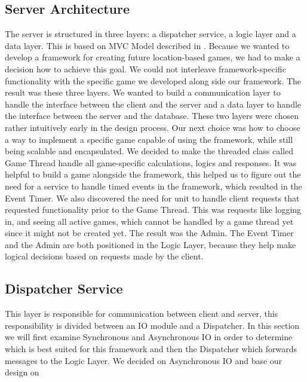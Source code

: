 \subsection{Server Architecture}
\label{sec:server}

The server is structured in three layers: a dispatcher service, a logic layer and a data layer. This is based on MVC Model described in . Because we wanted to develop a framework for creating future location-based games, we had to make a decision how to achieve this goal. We could not interleave framework-specific functionality with the specific game we developed along side our framework. The result was these three layers. We wanted to build a communication layer to handle the interface between the client and the server and a data layer to handle the interface between the server and the database. These two layers were chosen rather intuitively early in the design process. Our next choice was how to choose a way to implement a specific game capable of using the framework, while still being scalable and encapsulated. We decided to make the threaded class called Game Thread handle all game-specific calculations, logics and responses. 
It was helpful to build a game alongside the framework, this helped us to figure out the need for a service to handle timed events in the framework, which resulted in the Event Timer. We also discovered the need for unit to handle client requests that requested functionality prior to the Game Thread. This was requests like logging in, and seeing all active games, which cannot be handled by a game thread yet since it might not be created yet. The result was the Admin. The Event Timer and the Admin are both positioned in the Logic Layer, because they help make logical decisions based on requests made by the client. 



\subsection{Dispatcher Service}
This layer is responsible for communication between client and server, this responsibility is divided between an IO module and a Dispatcher. In this section we will first examine Synchronous and Asynchronous IO in order to determine which is best suited for this framework and then the Dispatcher which forwards messages to the Logic Layer. We decided on Asynchronous IO and base our design on \cite{?} 	 %

